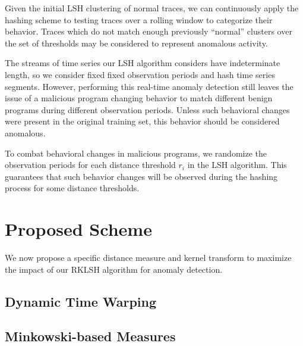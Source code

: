 \documentclass[a4paper]{article}
\theoremstyle{def}
\theoremstyle{thm}
\begin{document}
Given the initial LSH clustering of normal traces, we can continuously apply the hashing scheme to testing traces over a rolling window to categorize their behavior.
Traces which do not match enough previously ``normal'' clusters over the set of thresholds may be considered to represent anomalous activity.

The streams of time series our LSH algorithm considers have indeterminate length, so we consider fixed fixed observation periods and hash time series segments.
However, performing this real-time anomaly detection still leaves the issue of a malicious program changing behavior to match different benign programs during different observation periods.
Unless such behavioral changes were present in the original training set, this behavior should be considered anomalous.

To combat behavioral changes in malicious programs, we randomize the observation periods for each distance threshold $r_i$ in the LSH algorithm.
This guarantees that such behavior changes will be observed during the hashing process for some distance thresholds.

\iffalse
\subsection{Unsupervised, Intelligent Adversary}

A similar approach to Section~\ref{subsec:anomaly_detection} can be applied without a predetermined training set for time series classification through clustering.
Adjusting the set of threshold values confers the notion of closeness, which may be used to determine which sets of output traces resulted from the same input to a program, for example.
\fi

\section{Proposed Scheme}
\label{sec:proposed_scheme}

We now propose a specific distance measure and kernel transform to maximize the impact of our RKLSH algorithm for anomaly detection.

\subsection{Dynamic Time Warping}


\subsection{Minkowski-based Measures}
\end{document}
